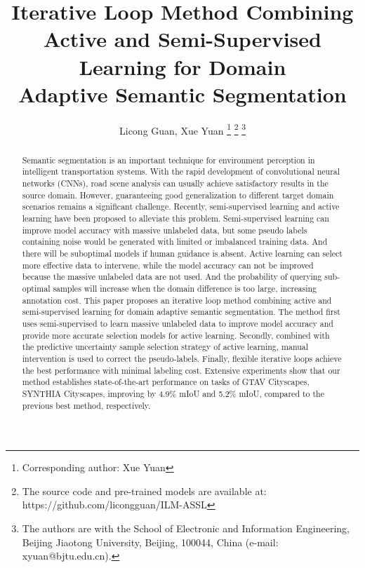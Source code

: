\documentclass[journal]{IEEEtran}
\begin{document}
\title{Iterative Loop Method Combining Active and Semi-Supervised Learning for Domain \\Adaptive Semantic Segmentation}




\author{Licong Guan,
        Xue Yuan
\thanks{Corresponding author: Xue Yuan}
\thanks{The source code and pre-trained models are available at: https://github.com/licongguan/ILM-ASSL}
\thanks{The authors are with the School of Electronic and Information Engineering, Beijing Jiaotong University, Beijing, 
100044, China (e-mail: xyuan@bjtu.edu.cn).}}











\maketitle

\begin{abstract}
Semantic segmentation is an important technique for environment perception in intelligent transportation systems. With the rapid development of convolutional neural networks (CNNs), road scene analysis can usually achieve satisfactory results in the source domain. However, guaranteeing good generalization to different target domain scenarios remains a significant challenge. Recently, semi-supervised learning and active learning have been proposed to alleviate this problem. Semi-supervised learning can improve model accuracy with massive unlabeled data, but some pseudo labels containing noise would be generated with limited or imbalanced training data. And there will be suboptimal models if human guidance is absent. Active learning can select more effective data to intervene, while the model accuracy can not be improved because the massive unlabeled data are not used. And the probability of querying sub-optimal samples will increase when the domain difference is too large, increasing annotation cost. This paper proposes an iterative loop method combining active and semi-supervised learning for domain adaptive semantic segmentation. The method first uses semi-supervised to learn massive unlabeled data to improve model accuracy and provide more accurate selection models for active learning. Secondly, combined with the predictive uncertainty sample selection strategy of active learning, manual intervention is used to correct the pseudo-labels. Finally, flexible iterative loops achieve the best performance with minimal labeling cost. Extensive experiments show that our method establishes state-of-the-art performance on tasks of GTAV  Cityscapes, SYNTHIA  Cityscapes, improving by 4.9\% mIoU and 5.2\% mIoU, compared to the previous best method, respectively.
\end{abstract}
\end{document}
